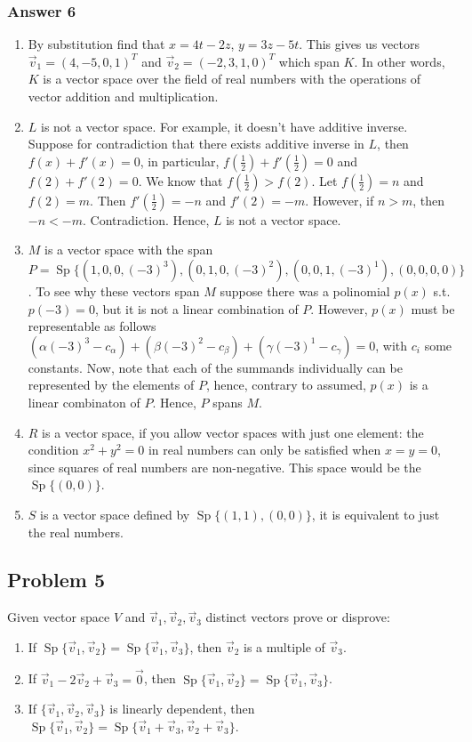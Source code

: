 \documentclass[11pt]{article}
\DeclareMathOperator{\Sp}{Sp}
\begin{document}
\subsubsection{Answer 6}
\label{sec-1-4-1}
\begin{enumerate}
\item By substitution find that $x = 4t - 2z$, $y = 3z - 5t$.  This gives us
vectors $\vec{v}_1 = (4, -5, 0, 1)^T$ and $\vec{v}_2 = (-2, 3, 1, 0)^T$
which span $K$.  In other words, $K$ is a vector space over the field of
real numbers with the operations of vector addition and multiplication.
\item $L$ is not a vector space.  For example, it doesn't have additive
inverse.  Suppose for contradiction that there exists additive inverse in
$L$, then $f(x) + f'(x) = 0$, in particular, $f(\frac{1}{2}) +
       f'(\frac{1}{2}) = 0$ and $f(2) + f'(2) = 0$.  We know that
$f(\frac{1}{2}) > f(2)$.  Let $f(\frac{1}{2}) = n$ and $f(2) = m$.  Then
$f'(\frac{1}{2}) = -n$ and $f'(2) = -m$.  However, if $n > m$, then $-n <
       -m$.  Contradiction.  Hence, $L$ is not a vector space.
\item $M$ is a vector space with the span $P = \Sp\{(1, 0, 0, (-3)^3), (0, 1,
       0, (-3)^2), (0, 0, 1, (-3)^1), \allowbreak (0, 0, 0, 0)\}$.  To see why
these vectors span $M$ suppose there was a polinomial $p(x)$ s.t. $p(-3)
       = 0$, but it is not a linear combination of $P$.  However, $p(x)$ must be
representable as follows $(\alpha(-3)^3 - c_{\alpha}) + (\beta(-3)^2 -
       c_{\beta}) + (\gamma(-3)^1 - c_{\gamma}) = 0$, with $c_i$ some constants.
Now, note that each of the summands individually can be represented by
the elements of $P$, hence, contrary to assumed, $p(x)$ is a linear
combinaton of $P$.  Hence, $P$ spans $M$.
\item $R$ is a vector space, if you allow vector spaces with just one element:
the condition $x^2+y^2=0$ in real numbers can only be satisfied when
$x=y=0$, since squares of real numbers are non-negative.  This space
would be the $\Sp\{(0, 0)\}$.
\item $S$ is a vector space defined by $\Sp\{(1, 1), (0, 0)\}$, it is equivalent
to just the real numbers.
\end{enumerate}

\subsection{Problem 5}
\label{sec-1-5}
Given vector space $V$ and $\vec{v}_1, \vec{v}_2, \vec{v}_3$ distinct vectors
prove or disprove:
\begin{enumerate}
\item If $\Sp\{\vec{v}_1, \vec{v}_2\} = \Sp\{\vec{v}_1, \vec{v}_3\}$, then
$\vec{v}_2$ is a multiple of $\vec{v}_3$.
\item If $\vec{v}_1 - 2\vec{v}_2 + \vec{v}_3 = \vec{0}$, then 
$\Sp\{\vec{v}_1, \vec{v}_2\} = \Sp\{\vec{v}_1, \vec{v}_3\}$.
\item If $\{\vec{v}_1, \vec{v}_2, \vec{v}_3\}$ is linearly dependent, then
$\Sp\{\vec{v}_1, \vec{v}_2\} = \Sp\{\vec{v}_1 + \vec{v}_3, \vec{v}_2 +
      \vec{v}_3\}$.
\end{enumerate}
\end{document}
